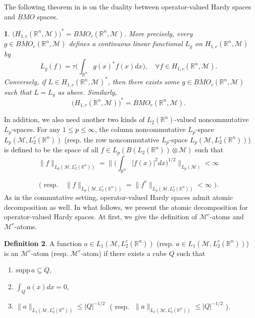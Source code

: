 \documentclass[oneside,english,a4wide]{amsart}
\numberwithin{equation}{section}
\numberwithin{figure}{section}
\theoremstyle{plain}
\newtheorem{thm}{\protect\theoremname}[section]
\theoremstyle{plain}
\theoremstyle{definition}
\theoremstyle{plain}
\theoremstyle{remark}
\theoremstyle{definition}
\newtheorem{definition}[thm]{Definition}
\theoremstyle{remark}
\theoremstyle{definition}
\providecommand{\theoremname}{Theorem}
\newcommand{\8}{\infty}
\begin{document}
The following theorem in \cite{Mei1} is on the duality between operator-valued Hardy spaces and $BMO$ spaces.
\begin{thm}\label{HBMOdual}
   $\big(H_{1,c}(\mathbb{R}^n,\mathcal{M})\big)^*=BMO_c(\mathbb{R}^n,\mathcal{M})$. More precisely, every $g\in BMO_c(\mathbb{R}^n,\mathcal{M})$ defines a continuous linear functional $L_g$ on $H_{1,c}(\mathbb{R}^n,\mathcal{M})$ by
    \begin{equation*}
    	L_g(f)=\tau\biggl(\int_{\mathbb{R}^n} g(x)^*f(x)dx\biggr),\quad \forall f\in H_{1,c}(\mathbb{R}^n,\mathcal{M}).
    \end{equation*}
    Conversely, if $L\in H_{1,c}(\mathbb{R}^n,\mathcal{M})^*$, then there exists some $g\in BMO_c(\mathbb{R}^n,\mathcal{M})$ such that $L=L_g$ as above.
    Similarly,
    \begin{equation*}
       \big(H_{1,r}(\mathbb{R}^n,\mathcal{M})\big)^*=BMO_r(\mathbb{R}^n,\mathcal{M}).
    \end{equation*}
\end{thm}

In addition, we also need another two kinds of $L_2(\mathbb{R}^n)$-valued noncommutative $L_p$-spaces. For any $1\le p\le\infty$, the column noncommutative $L_p$-space $L_p(\mathcal{M},L_2^c(\mathbb{R}^n))$ (resp. the row noncommutative $L_p$-space $L_p(\mathcal{M},L_2^r(\mathbb{R}^n))$) is defined to be the space of all $f\in L_p(B(L_2(\mathbb{R}^n))\otimes \mathcal{M})$ such that
\begin{equation*}
	\|f\|_{L_p(\mathcal{M},L_2^c(\mathbb{R}^n))}=\bigg\|\biggl(\int_{\mathbb{R}^n} |f(x)|^2dx\biggr)^{1/2}\bigg\|_{L_p(\mathcal{M})}<\infty
\end{equation*}

\begin{equation*}
   \bigg(\,\, \mathrm{resp}.\quad	\|f\|_{L_p(\mathcal{M},L_2^r(\mathbb{R}^n))}=\|f^*\|_{L_p(\mathcal{M},L_2^c(\mathbb{R}^n))} <\infty \,\,\bigg).
\end{equation*}
As in the commutative setting, operator-valued Hardy spaces admit atomic decomposition as well. In what follows, we present the atomic decomposition for operator-valued Hardy spaces. At first, we give the definition of $\mathcal{M}^c$-atoms and $\mathcal{M}^r$-atoms.
\begin{definition}
	A function $a\in L_1(\mathcal{M},L_2^c(\mathbb{R}^n))$ (resp. $a\in L_1(\mathcal{M},L_2^r(\mathbb{R}^n))$) is an $\mathcal{M}^c$-atom  (resp. $\mathcal{M}^r$-atom) if there exists a cube $Q$ such that
	\begin{enumerate}
		\item $\mathrm{supp}\,a\subseteq Q$,
		\item $\int_Q a(x)dx=0$,
		\item $\|a\|_{L_1(\mathcal{M},L_2^c(\mathbb{R}^n))}\le |Q|^{-1/2}$\,\, (\,\,resp.\,\, $\|a\|_{L_1(\mathcal{M},L_2^r(\mathbb{R}^n))}\le |Q|^{-1/2}$\,\,).
	\end{enumerate}
\end{definition}
\end{document}
